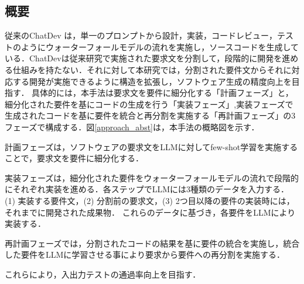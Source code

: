 \documentclass[submit,techrep,noauthor]{ipsj}
\begin{document}
\subsection{概要}
従来のChatDev\cite{qian-etal-2024-chatdev} は，単一のプロンプトから設計，実装，コードレビュー，テストのようにウォーターフォールモデルの流れを実施し，ソースコードを生成している．ChatDevは従来研究\cite{tosem}で実施された要求文を分割して，段階的に開発を進める仕組みを持たない．それに対して本研究では，分割された要件文からそれに対応する開発が実施できるように構造を拡張し，ソフトウェア生成の精度向上を目指す．
具体的には，本手法は要求文を要件に細分化する「計画フェーズ」と，細分化された要件を基にコードの生成を行う「実装フェーズ」,実装フェーズで生成されたコードを基に要件を統合と再分割を実施する「再計画フェーズ」の3フェーズで構成する．図\ref{approach_abst}は，本手法の概略図を示す．

計画フェーズは，ソフトウェアの要求文をLLMに対してfew-shot学習を実施することで，要求文を要件に細分化する．

実装フェーズは，細分化された要件をウォーターフォールモデルの流れで段階的にそれぞれ実装を進める．各ステップでLLMには3種類のデータを入力する．
(1) 実装する要件文，(2) 分割前の要求文，(3) 2つ目以降の要件の実装時には，それまでに開発された成果物．
これらのデータに基づき，各要件をLLMにより実装する．

再計画フェーズでは，分割されたコードの結果を基に要件の統合を実施し，統合した要件をLLMに学習させる事により要求から要件への再分割を実施する．

これらにより，入出力テストの通過率向上を目指す．



\end{document}
